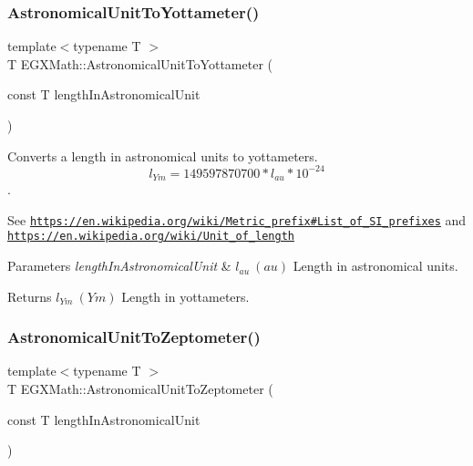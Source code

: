 \subsubsection{\texorpdfstring{Astronomical\+Unit\+To\+Yottameter()}{AstronomicalUnitToYottameter()}}
{\footnotesize\ttfamily template$<$typename T $>$ \\
T E\+G\+X\+Math\+::\+Astronomical\+Unit\+To\+Yottameter (\begin{DoxyParamCaption}\item[{const T}]{length\+In\+Astronomical\+Unit }\end{DoxyParamCaption})}



Converts a length in astronomical units to yottameters. \[ l_{Ym}=149597870700 * l_{au} * 10^{-24} \]. 

See \href{https://en.wikipedia.org/wiki/Metric_prefix#List_of_SI_prefixes}{\tt https\+://en.\+wikipedia.\+org/wiki/\+Metric\+\_\+prefix\#\+List\+\_\+of\+\_\+\+S\+I\+\_\+prefixes} and \href{https://en.wikipedia.org/wiki/Unit_of_length}{\tt https\+://en.\+wikipedia.\+org/wiki/\+Unit\+\_\+of\+\_\+length} 
\begin{DoxyParams}{Parameters}
{\em length\+In\+Astronomical\+Unit} & $ l_{au}\ (au)$ Length in astronomical units. \\
\hline
\end{DoxyParams}
\begin{DoxyReturn}{Returns}
$ l_{Ym}\ (Ym)$ Length in yottameters. 
\end{DoxyReturn}
\mbox{\label{group___e_g_x_math-_conversions-_length_conversions-_astronomical-_astronomical_unit-_s_i_ga1b83999f8a97d59122f34bd7af3c6cf5}} 
\subsubsection{\texorpdfstring{Astronomical\+Unit\+To\+Zeptometer()}{AstronomicalUnitToZeptometer()}}
{\footnotesize\ttfamily template$<$typename T $>$ \\
T E\+G\+X\+Math\+::\+Astronomical\+Unit\+To\+Zeptometer (\begin{DoxyParamCaption}\item[{const T}]{length\+In\+Astronomical\+Unit }\end{DoxyParamCaption})}




